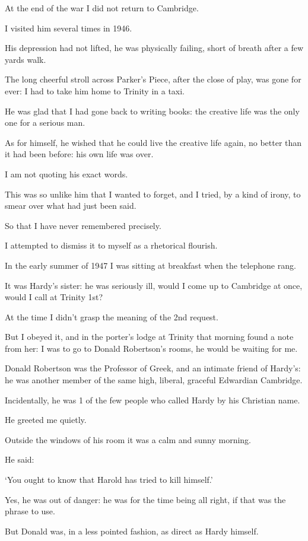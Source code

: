 \documentclass{article}
\numberwithin{equation}{section}
\begin{document}
%
At the end of the war I did not return to Cambridge.

I visited him several times in 1946.

His depression had not lifted, he was physically failing, short of breath after a few yards walk.

The long cheerful stroll across Parker's Piece, after the close of play, was gone for ever: I had to take him home to Trinity in a taxi.

He was glad that I had gone back to writing books: the creative life was the only one for a serious man.

As for himself, he wished that he could live the creative life again, no better than it had been before: his own life was over.

%
I am not quoting his exact words.

This was so unlike him that I wanted to forget, and I tried, by a kind of irony, to smear over what had just been said.

So that I have never remembered precisely.

I attempted to dismiss it to myself as a rhetorical flourish.

%
In the early summer of 1947 I was sitting at breakfast when the telephone rang.

It was Hardy's sister: he was seriously ill, would I come up to Cambridge at once, would I call at Trinity 1st?

At the time I didn't grasp the meaning of the 2nd request.

But I obeyed it, and in the porter's lodge at Trinity that morning found a note from her: I was to go to Donald Robertson's rooms, he would be waiting for me.

%
Donald Robertson was the Professor of Greek, and an intimate friend of Hardy's: he was another member of the same high, liberal, graceful Edwardian Cambridge.

Incidentally, he was 1 of the few people who called Hardy by his Christian name.

He greeted me quietly.

Outside the windows of his room it was a calm and sunny morning.

He said:

`You ought to know that Harold has tried to kill himself.'

%
Yes, he was out of danger: he was for the time being all right, if that was the phrase to use.

But Donald was, in a less pointed fashion, as direct as Hardy himself.
\end{document}
